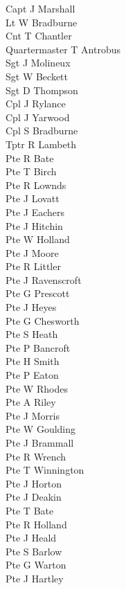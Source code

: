 \begin{multicols}{3}
  \small
  \noindent
  Capt J Marshall \\
  Lt W Bradburne \\
  Cnt T Chantler \\
  Quartermaster T Antrobus \\
  Sgt J Molineux \\
  Sgt W Beckett \\
  Sgt D Thompson \\
  Cpl J Rylance \\
  Cpl J Yarwood \\
  Cpl S Bradburne \\
  Tptr R Lambeth \\
  Pte R Bate \\
  Pte T Birch \\
  Pte R Lownds \\
  Pte J Lovatt \\
  Pte J Eachers \\
  Pte J Hitchin \\
  Pte W Holland \\
  Pte J Moore \\
  Pte R Littler \\
  Pte J Ravenscroft \\
  Pte G Prescott \\
  Pte J Heyes \\
  Pte G Chesworth \\
  Pte S Heath \\
  Pte P Bancroft \\
  Pte H Smith \\
  Pte P Eaton \\
  Pte W Rhodes \\
  Pte A Riley \\
  Pte J Morris \\
  Pte W Goulding \\
  Pte J Brammall \\
  Pte R Wrench \\
  Pte T Winnington \\
  Pte J Horton \\
  Pte J Deakin \\
  Pte T Bate \\
  Pte R Holland \\
  Pte J Heald \\
  Pte S Barlow \\
  Pte G Warton \\
  Pte J Hartley \\
\end{multicols}

